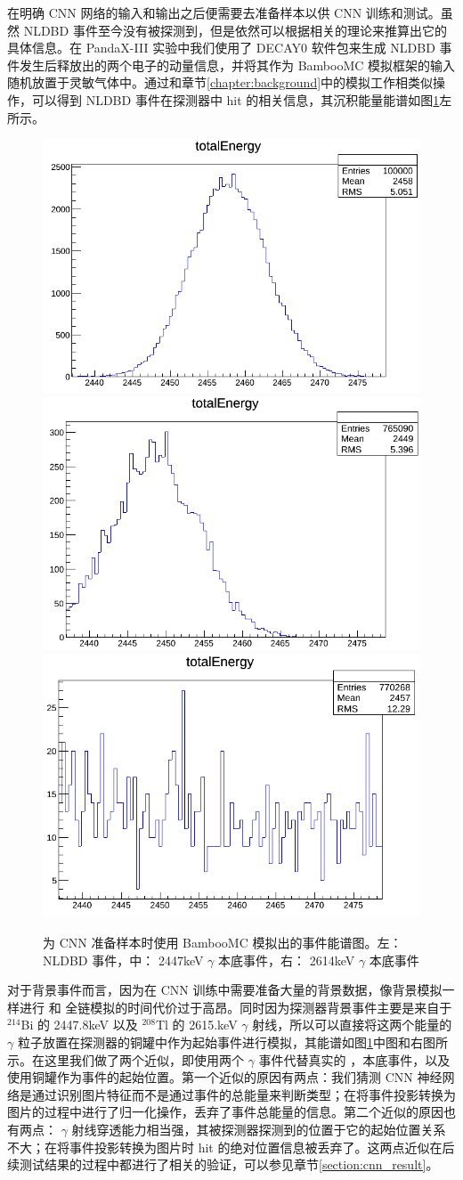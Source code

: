 在明确 CNN 网络的输入和输出之后便需要去准备样本以供 CNN 训练和测试。虽然 NLDBD 事件至今没有被探测到，但是依然可以根据相关的理论来推算出它的具体信息。在 PandaX-III 实验中我们使用了 DECAY0 软件包\supercite{ponkratenko2000event}来生成 NLDBD 事件发生后释放出的两个电子的动量信息，并将其作为 BambooMC 模拟框架的输入随机放置于灵敏气体中。通过和章节\ref{chapter:background}中的模拟工作相类似操作，可以得到 NLDBD 事件在探测器中 hit 的相关信息，其沉积能量能谱如图\ref{fig:nldbd_energy}左所示。

\begin{figure}
    \centering
    \includegraphics[width=0.3\columnwidth]{pic/nldbd_raw_spectrum.png}
    \includegraphics[width=0.3\columnwidth]{pic/2447_raw_spectrum.png}
    \includegraphics[width=0.3\columnwidth]{pic/2614_raw_spectrum.png}
    \caption{为 CNN 准备样本时使用 BambooMC 模拟出的事件能谱图。左： NLDBD 事件，中： 2447keV $\gamma$ 本底事件，右： 2614keV $\gamma$ 本底事件}
    \label{fig:nldbd_energy}
\end{figure}

对于背景事件而言，因为在 CNN 训练中需要准备大量的背景数据，像背景模拟一样进行 \utte 和 \thttt 全链模拟的时间代价过于高昂。同时因为探测器背景事件主要是来自于 $^{214}$Bi 的 2447.8keV 以及 $^{208}$Tl 的 2615.keV $\gamma$ 射线，所以可以直接将这两个能量的 $\gamma$ 粒子放置在探测器的铜罐中作为起始事件进行模拟，其能谱如图\ref{fig:nldbd_energy}中图和右图所示。在这里我们做了两个近似，即使用两个 $\gamma$ 事件代替真实的 \utte，\thttt 本底事件，以及使用铜罐作为事件的起始位置。第一个近似的原因有两点：我们猜测 CNN 神经网络是通过识别图片特征而不是通过事件的总能量来判断类型；在将事件投影转换为图片的过程中进行了归一化操作，丢弃了事件总能量的信息。第二个近似的原因也有两点： $\gamma$ 射线穿透能力相当强，其被探测器探测到的位置于它的起始位置关系不大；在将事件投影转换为图片时 hit 的绝对位置信息被丢弃了。这两点近似在后续测试结果的过程中都进行了相关的验证，可以参见章节\ref{section:cnn_result}。

